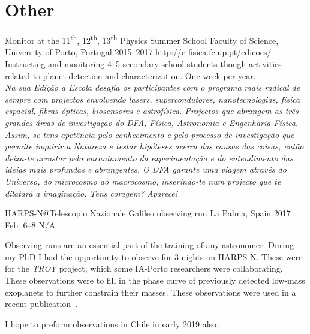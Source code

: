\section{Other}\label{app_sec:other}

{Monitor at the 11\textsuperscript{th}, 12\textsuperscript{th}, 13\textsuperscript{th} Physics Summer School}
{Faculty of Science, University of Porto, Portugal}%
{2015--2017}%
{http://e-fisica.fc.up.pt/edicoes/}%
{}%
{Instructing and monitoring 4--5 secondary school students though activities related to planet detection and characterization. One week per year.\\
  \emph{Na sua Edição a Escola desafia os participantes com o programa mais radical de sempre com projectos envolvendo lasers, supercondutores, nanotecnologias, física espacial, fibras ópticas, biosensores e astrofísica. Projectos que abrangem as três grandes áreas de investigação do DFA, Física, Astronomia e Engenharia Física. Assim, se tens apetência pelo conhecimento e pelo processo de investigação que permite inquirir a Natureza e testar hipóteses acerca das causas das coisas, então deixa-te arrastar pelo encantamento da experimentação e do entendimento das ideias mais profundas e abrangentes. O DFA garante uma viagem através do Universo, do microcosmo ao macrocosmo, inserindo-te num projecto que te dilatará a imaginação. Tens coragem? Aparece!}}%

{HARPS-N@Telescopio Nazionale Galileo observing run}
{La Palma, Spain}%
{2017 Feb. 6--8}%
{N/A}%
{}%
{Observing runs are an essential part of the training of any astronomer.
    During my PhD I had the opportunity to observe for 3 nights on HARPS-N. These were for the \emph{TROY} project, which some IA-Porto researchers were collaborating.  These observations were to fill in the phase curve of previously detected low-mass exoplanets to further constrain their masses. These observations were used in a recent publication~\citet{lillo-box_troy_2018}.

    {\red{} I hope to preform observations in Chile in early 2019 also.}
}%
